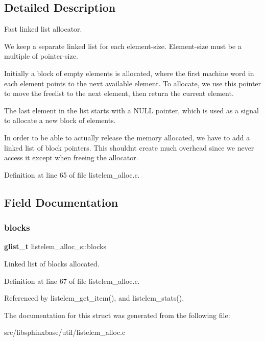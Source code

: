 \subsection{Detailed Description}
Fast linked list allocator. 

We keep a separate linked list for each element-\/size. Element-\/size must be a multiple of pointer-\/size.

Initially a block of empty elements is allocated, where the first machine word in each element points to the next available element. To allocate, we use this pointer to move the freelist to the next element, then return the current element.

The last element in the list starts with a N\+U\+LL pointer, which is used as a signal to allocate a new block of elements.

In order to be able to actually release the memory allocated, we have to add a linked list of block pointers. This shouldn\textquotesingle{}t create much overhead since we never access it except when freeing the allocator. 

Definition at line 65 of file listelem\+\_\+alloc.\+c.



\subsection{Field Documentation}
\mbox{\label{structlistelem__alloc__s_a1216578b1d5416dc0a03c802cfa1def9}} 
\subsubsection{blocks}
{\footnotesize\ttfamily \textbf{ glist\+\_\+t} listelem\+\_\+alloc\+\_\+s\+::blocks}



Linked list of blocks allocated. 



Definition at line 67 of file listelem\+\_\+alloc.\+c.



Referenced by listelem\+\_\+get\+\_\+item(), and listelem\+\_\+stats().



The documentation for this struct was generated from the following file\+:\begin{DoxyCompactItemize}
\item 
src/libsphinxbase/util/listelem\+\_\+alloc.\+c\end{DoxyCompactItemize}
